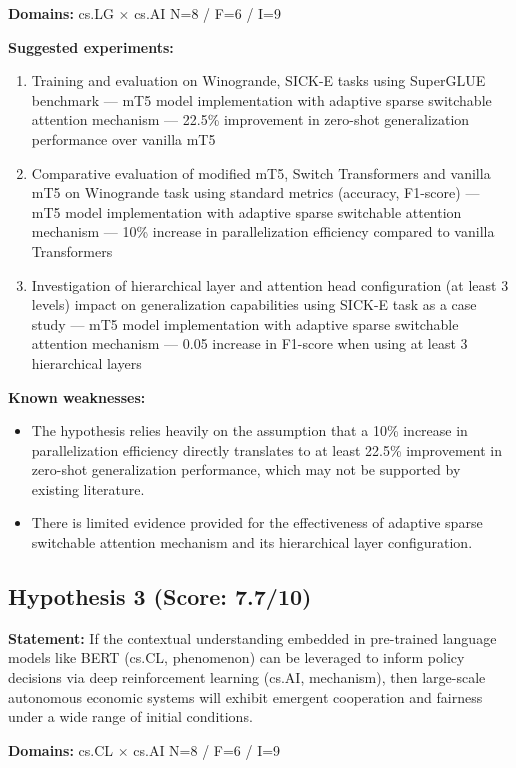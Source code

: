 \documentclass[12pt,a4paper]{article}
\begin{document}
\noindent\textbf{Domains:} cs.LG $\times$ cs.AI
\hspace{1em} N=8 / F=6 / I=9

\textbf{Suggested experiments:}
\begin{enumerate}
  \item Training and evaluation on Winogrande, SICK-E tasks using SuperGLUE benchmark — mT5 model implementation with adaptive sparse switchable attention mechanism — 22.5\% improvement in zero-shot generalization performance over vanilla mT5
  \item Comparative evaluation of modified mT5, Switch Transformers and vanilla mT5 on Winogrande task using standard metrics (accuracy, F1-score) — mT5 model implementation with adaptive sparse switchable attention mechanism — 10\% increase in parallelization efficiency compared to vanilla Transformers
  \item Investigation of hierarchical layer and attention head configuration (at least 3 levels) impact on generalization capabilities using SICK-E task as a case study — mT5 model implementation with adaptive sparse switchable attention mechanism — 0.05 increase in F1-score when using at least 3 hierarchical layers
\end{enumerate}

\textbf{Known weaknesses:}
\begin{itemize}
  \item The hypothesis relies heavily on the assumption that a 10\% increase in parallelization efficiency directly translates to at least 22.5\% improvement in zero-shot generalization performance, which may not be supported by existing literature.
  \item There is limited evidence provided for the effectiveness of adaptive sparse switchable attention mechanism and its hierarchical layer configuration.
\end{itemize}
\subsection*{Hypothesis 3 (Score: 7.7/10)}

\textbf{Statement:} If the contextual understanding embedded in pre-trained language models like BERT (cs.CL, phenomenon) can be leveraged to inform policy decisions via deep reinforcement learning (cs.AI, mechanism), then large-scale autonomous economic systems will exhibit emergent cooperation and fairness under a wide range of initial conditions.

\noindent\textbf{Domains:} cs.CL $\times$ cs.AI
\hspace{1em} N=8 / F=6 / I=9
\end{document}

